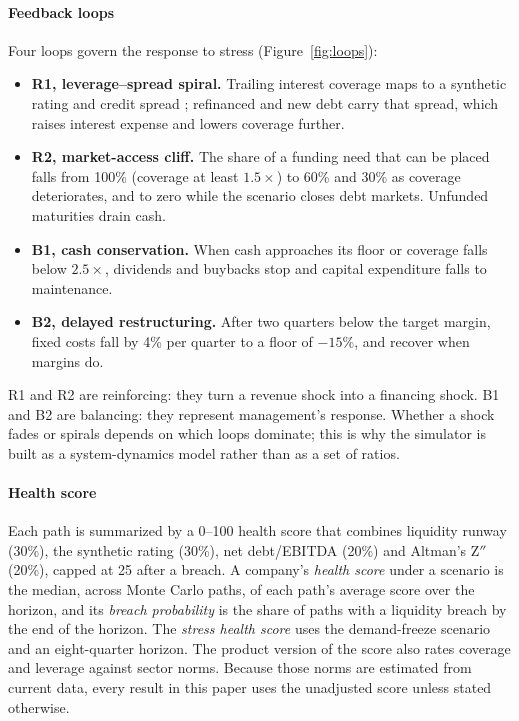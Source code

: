\paragraph{Feedback loops} Four loops govern the response to stress (Figure~\ref{fig:loops}):
\begin{itemize}
\item \textbf{R1, leverage--spread spiral.} Trailing interest coverage maps to a synthetic rating and credit spread \citep{damodaran2026}; refinanced and new debt carry that spread, which raises interest expense and lowers coverage further.
\item \textbf{R2, market-access cliff.} The share of a funding need that can be placed falls from 100\% (coverage at least $1.5\times$) to 60\% and 30\% as coverage deteriorates, and to zero while the scenario closes debt markets. Unfunded maturities drain cash.
\item \textbf{B1, cash conservation.} When cash approaches its floor or coverage falls below $2.5\times$, dividends and buybacks stop and capital expenditure falls to maintenance.
\item \textbf{B2, delayed restructuring.} After two quarters below the target margin, fixed costs fall by 4\% per quarter to a floor of $-15\%$, and recover when margins do.
\end{itemize}
R1 and R2 are reinforcing: they turn a revenue shock into a financing shock. B1 and B2 are balancing: they represent management's response. Whether a shock fades or spirals depends on which loops dominate; this is why the simulator is built as a system-dynamics model \citep{forrester1961,sterman2000,morecroft2015} rather than as a set of ratios.

\paragraph{Health score} Each path is summarized by a 0--100 health score that combines liquidity runway (30\%), the synthetic rating (30\%), net debt/EBITDA (20\%) and Altman's Z$''$ \citep{altman2006} (20\%), capped at 25 after a breach. A company's \emph{health score} under a scenario is the median, across Monte Carlo paths, of each path's average score over the horizon, and its \emph{breach probability} is the share of paths with a liquidity breach by the end of the horizon. The \emph{stress health score} uses the demand-freeze scenario and an eight-quarter horizon. The product version of the score also rates coverage and leverage against sector norms. Because those norms are estimated from current data, every result in this paper uses the unadjusted score unless stated otherwise.

